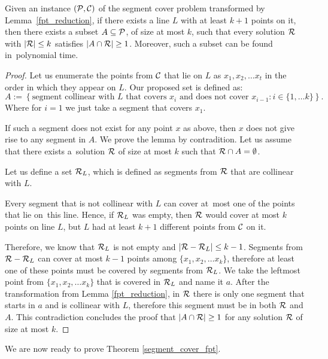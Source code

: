 \begin{lemma}
	\label{fpt_long_lines}
	Given an instance $(\mathcal{P}, \mathcal{C})$
	of the segment cover problem 
	transformed by Lemma~\ref{fpt_reduction},
	if there exists a line $L$ with at least
	$k+1$ points on it, then there exists a subset $A \subseteq \mathcal{P}$,
	of size at most $k$,
	such that every solution $\mathcal{R}$ with $|\mathcal{R}| \le k$
	satisfies $|A \cap \mathcal{R}| \ge 1$.
	Moreover, such a subset can be found in~polynomial time.
\end{lemma}
\begin{proof}
Let us enumerate the points from $\mathcal{C}$ that lie on $L$ as $x_1, x_2, \ldots x_t$
in the order in which they appear on $L$.
Our proposed set is defined as:
$$A := \left\{ \text{segment collinear with } L \text{ that covers } x_i
\text{ and does not cover } x_{i-1} : i \in \{1, \ldots k\}\right\}.$$
Where for $i = 1$ we just take a segment that covers $x_1$.

If such a segment does not exist for any point $x$
as above, then $x$ does not give rise to any segment in $A$.
We prove the lemma by contradition. Let us assume that there
exists a~solution $\mathcal{R}$ of size at most $k$ such that $\mathcal{R} \cap A = \emptyset$.


Let us define a set $\mathcal{R}_L$,
which is defined as segments from $\mathcal{R}$ that are collinear with $L$.

Every segment that is not collinear with $L$ can cover at~most one of
the points that lie on~this line.
Hence, if $\mathcal{R}_L$ was empty, then
$\mathcal{R}$ would cover at most $k$ points on line $L$,
but $L$ had at least $k+1$ different points from $\mathcal{C}$ on it.

Therefore, we know that $\mathcal{R}_L$ is not empty
and $|\mathcal{R} - \mathcal{R}_L| \le k-1$.
Segments from $\mathcal{R} - \mathcal{R}_L$ can cover at most $k-1$
points among $\{x_1, x_2, \ldots x_k\}$, therefore at least
one of these points must be covered by segments from $\mathcal{R}_L$.
We take the leftmost point from $\{x_1, x_2, \ldots x_k\}$ that is
covered in $\mathcal{R}_L$ and name it $a$.
After the transformation from Lemma \ref{fpt_reduction},
in $\mathcal{R}$ there is only one segment
that starts in $a$ and is collinear with $L$,
therefore this segment must be in both $\mathcal{R}$ and $A$.
This contradiction concludes the proof that $|A \cap \mathcal{R}| \ge 1$
for any solution $\mathcal{R}$ of size at most $k$.
\end{proof}

We are now ready to prove Theorem \ref{segment_cover_fpt}.

